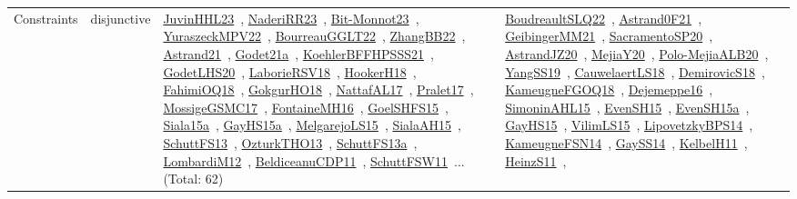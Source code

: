 {\begin{longtable}{lp{3cm}>{\raggedright\arraybackslash}p{6cm}>{\raggedright\arraybackslash}p{6cm}>{\raggedright\arraybackslash}p{8cm}}
Constraints & disjunctive & \href{works/JuvinHHL23.pdf}{JuvinHHL23}~\cite{JuvinHHL23}, \href{works/NaderiRR23.pdf}{NaderiRR23}~\cite{NaderiRR23}, \href{works/Bit-Monnot23.pdf}{Bit-Monnot23}~\cite{Bit-Monnot23}, \href{works/YuraszeckMPV22.pdf}{YuraszeckMPV22}~\cite{YuraszeckMPV22}, \href{works/BourreauGGLT22.pdf}{BourreauGGLT22}~\cite{BourreauGGLT22}, \href{works/ZhangBB22.pdf}{ZhangBB22}~\cite{ZhangBB22}, \href{works/Astrand21.pdf}{Astrand21}~\cite{Astrand21}, \href{works/Godet21a.pdf}{Godet21a}~\cite{Godet21a}, \href{works/KoehlerBFFHPSSS21.pdf}{KoehlerBFFHPSSS21}~\cite{KoehlerBFFHPSSS21}, \href{works/GodetLHS20.pdf}{GodetLHS20}~\cite{GodetLHS20}, \href{works/LaborieRSV18.pdf}{LaborieRSV18}~\cite{LaborieRSV18}, \href{works/HookerH18.pdf}{HookerH18}~\cite{HookerH18}, \href{works/FahimiOQ18.pdf}{FahimiOQ18}~\cite{FahimiOQ18}, \href{works/GokgurHO18.pdf}{GokgurHO18}~\cite{GokgurHO18}, \href{works/NattafAL17.pdf}{NattafAL17}~\cite{NattafAL17}, \href{works/Pralet17.pdf}{Pralet17}~\cite{Pralet17}, \href{works/MossigeGSMC17.pdf}{MossigeGSMC17}~\cite{MossigeGSMC17}, \href{works/FontaineMH16.pdf}{FontaineMH16}~\cite{FontaineMH16}, \href{works/GoelSHFS15.pdf}{GoelSHFS15}~\cite{GoelSHFS15}, \href{works/Siala15a.pdf}{Siala15a}~\cite{Siala15a}, \href{works/GayHS15a.pdf}{GayHS15a}~\cite{GayHS15a}, \href{works/MelgarejoLS15.pdf}{MelgarejoLS15}~\cite{MelgarejoLS15}, \href{works/SialaAH15.pdf}{SialaAH15}~\cite{SialaAH15}, \href{works/SchuttFS13.pdf}{SchuttFS13}~\cite{SchuttFS13}, \href{works/OzturkTHO13.pdf}{OzturkTHO13}~\cite{OzturkTHO13}, \href{works/SchuttFS13a.pdf}{SchuttFS13a}~\cite{SchuttFS13a}, \href{works/LombardiM12.pdf}{LombardiM12}~\cite{LombardiM12}, \href{works/BeldiceanuCDP11.pdf}{BeldiceanuCDP11}~\cite{BeldiceanuCDP11}, \href{works/SchuttFSW11.pdf}{SchuttFSW11}~\cite{SchuttFSW11}... (Total: 62) & \href{works/BoudreaultSLQ22.pdf}{BoudreaultSLQ22}~\cite{BoudreaultSLQ22}, \href{works/Astrand0F21.pdf}{Astrand0F21}~\cite{Astrand0F21}, \href{works/GeibingerMM21.pdf}{GeibingerMM21}~\cite{GeibingerMM21}, \href{works/SacramentoSP20.pdf}{SacramentoSP20}~\cite{SacramentoSP20}, \href{works/AstrandJZ20.pdf}{AstrandJZ20}~\cite{AstrandJZ20}, \href{works/MejiaY20.pdf}{MejiaY20}~\cite{MejiaY20}, \href{works/Polo-MejiaALB20.pdf}{Polo-MejiaALB20}~\cite{Polo-MejiaALB20}, \href{works/YangSS19.pdf}{YangSS19}~\cite{YangSS19}, \href{works/CauwelaertLS18.pdf}{CauwelaertLS18}~\cite{CauwelaertLS18}, \href{works/DemirovicS18.pdf}{DemirovicS18}~\cite{DemirovicS18}, \href{works/KameugneFGOQ18.pdf}{KameugneFGOQ18}~\cite{KameugneFGOQ18}, \href{works/Dejemeppe16.pdf}{Dejemeppe16}~\cite{Dejemeppe16}, \href{works/SimoninAHL15.pdf}{SimoninAHL15}~\cite{SimoninAHL15}, \href{works/EvenSH15.pdf}{EvenSH15}~\cite{EvenSH15}, \href{works/EvenSH15a.pdf}{EvenSH15a}~\cite{EvenSH15a}, \href{works/GayHS15.pdf}{GayHS15}~\cite{GayHS15}, \href{works/VilimLS15.pdf}{VilimLS15}~\cite{VilimLS15}, \href{works/LipovetzkyBPS14.pdf}{LipovetzkyBPS14}~\cite{LipovetzkyBPS14}, \href{works/KameugneFSN14.pdf}{KameugneFSN14}~\cite{KameugneFSN14}, \href{works/GaySS14.pdf}{GaySS14}~\cite{GaySS14}, \href{works/KelbelH11.pdf}{KelbelH11}~\cite{KelbelH11}, \href{works/HeinzS11.pdf}{HeinzS11}~\cite{HeinzS11}, 
\end{longtable}}
